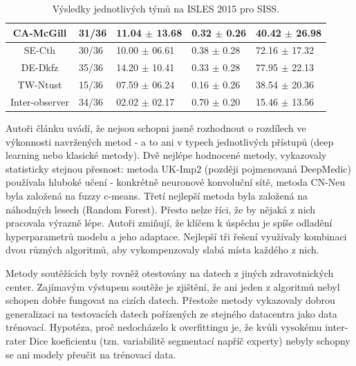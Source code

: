\documentclass[11pt]{article}
\begin{document}
\begin{table}[htp]
\begin{tabular}{cllll}
		CA-McGill       & 31/36                              & 11.04 $\pm$ 13.68                         & 0.32 $\pm$ 0.26                              & 40.42 $\pm$ 26.98                       \\ \hline
		SE-Cth          & 30/36                              & 10.00 $\pm$ 06.61                         & 0.38 $\pm$ 0.28                              & 72.16 $\pm$ 17.32                       \\ \hline
		DE-Dkfz         & 35/36                              & 14.20 $\pm$ 10.41                         & 0.33 $\pm$ 0.28                              & 77.95 $\pm$ 22.13                       \\ \hline
		TW-Ntust        & 15/36                              & 07.59 $\pm$ 06.24                         & 0.16 $\pm$ 0.26                              & 38.54 $\pm$ 20.36                       \\ \hline
		Inter-observer  & 34/36                              & 02.02 $\pm$ 02.17                         & 0.70 $\pm$ 0.20                              & 15.46 $\pm$ 13.56                       \\ \hline
	\end{tabular}
	\caption{Výsledky jednotlivých týmů na ISLES 2015 pro SISS.}
	\label{tbl-siss_results}
\end{table}

Autoři článku uvádí, že nejsou schopni jasně rozhodnout o rozdílech ve výkonnosti navržených metod - a to ani v typech jednotlivých přístupů (deep learning nebo klasické metody). Dvě nejlépe hodnocené metody, vykazovaly statisticky stejnou přesnost: metoda UK-Imp2 (později pojmenovaná DeepMedic) \cite{uk-imp2} používala hluboké učení - konkrétně \alert{neuronové konvoluční sítě}, metoda CN-Neu \cite{cn-neu} byla založená na fuzzy c-means. Třetí nejlepší metoda byla založená na náhodných lesech (\alert{Random Forest}). Přesto nelze říci, že by nějaká z nich pracovala výrazně lépe. Autoři zmiňují, že klíčem k úspěchu je spíše odladění hyperparametrů modelu a jeho adaptace. Nejlepší tři řešení využívaly kombinaci dvou různých algoritmů, aby vykompenzovaly slabá místa každého z nich.

Metody soutěžících byly rovněž otestovány na datech z jiných zdravotnických center. Zajímavým výstupem soutěže je zjištění, že ani jeden z algoritmů nebyl schopen dobře fungovat na cizích datech. Přestože metody vykazovaly dobrou generalizaci na testovacích datech pořízených ze stejného datacentra jako data trénovací. Hypotéza, proč nedocházelo k \alert{overfittingu} je, že kvůli vysokému inter-rater Dice koeficientu (tzn. variabilitě segmentací napříč experty) nebyly schopny se ani modely přeučit na trénovací data.
\end{document}
